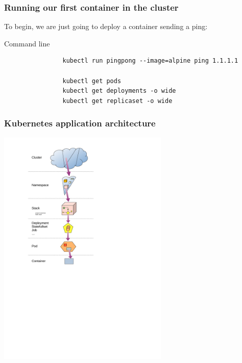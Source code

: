 	\begin{frame}[fragile]
		\frametitle{Running our first container in the cluster}
	
		To begin, we are just going to deploy a container sending a ping:
		\begin{block}{Command line}
			\begin{verbatim}
				kubectl run pingpong --image=alpine ping 1.1.1.1
				
				kubectl get pods
				kubectl get deployments -o wide
				kubectl get replicaset -o wide
			\end{verbatim}
		\end{block}
	\end{frame}
	
	\begin{frame}
		\frametitle{Kubernetes application architecture}
		
		\begin{center}
		\includegraphics[height=11.5cm]{../../../resources/color/fromCluster2container.pdf}
		\end{center}
		
	\end{frame}		

